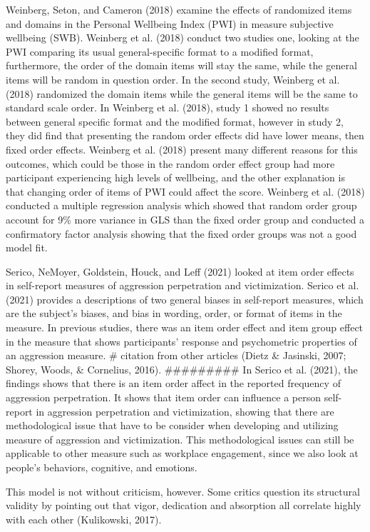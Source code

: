 \documentclass[
  man]{apa6}
\begin{document}
Weinberg, Seton, and Cameron (2018) examine the effects of randomized items and domains in the Personal Wellbeing Index (PWI) in measure subjective wellbeing (SWB). Weinberg et al. (2018) conduct two studies one, looking at the PWI comparing its usual general-specific format to a modified format, furthermore, the order of the domain items will stay the same, while the general items will be random in question order. In the second study, Weinberg et al. (2018) randomized the domain items while the general items will be the same to standard scale order. In Weinberg et al. (2018), study 1 showed no results between general specific format and the modified format, however in study 2, they did find that presenting the random order effects did have lower means, then fixed order effects. Weinberg et al. (2018) present many different reasons for this outcomes, which could be those in the random order effect group had more participant experiencing high levels of wellbeing, and the other explanation is that changing order of items of PWI could affect the score. Weinberg et al. (2018) conducted a multiple regression analysis which showed that random order group account for 9\% more variance in GLS than the fixed order group and conducted a confirmatory factor analysis showing that the fixed order groups was not a good model fit.

Serico, NeMoyer, Goldstein, Houck, and Leff (2021) looked at item order effects in self-report measures of aggression perpetration and victimization. Serico et al. (2021) provides a descriptions of two general biases in self-report measures, which are the subject's biases, and bias in wording, order, or format of items in the measure. In previous studies, there was an item order effect and item group effect in the measure that shows participants' response and psychometric properties of an aggression measure. \# citation from other articles (Dietz \& Jasinski, 2007; Shorey, Woods, \& Cornelius, 2016). \#\#\#\#\#\#\#\#\# In Serico et al. (2021), the findings shows that there is an item order affect in the reported frequency of aggression perpetration. It shows that item order can influence a person self-report in aggression perpetration and victimization, showing that there are methodological issue that have to be consider when developing and utilizing measure of aggression and victimization. This methodological issues can still be applicable to other measure such as workplace engagement, since we also look at people's behaviors, cognitive, and emotions.

This model is not without criticism, however. Some critics question its structural validity by pointing out that vigor, dedication and absorption all correlate highly with each other (Kulikowski, 2017).
\end{document}
